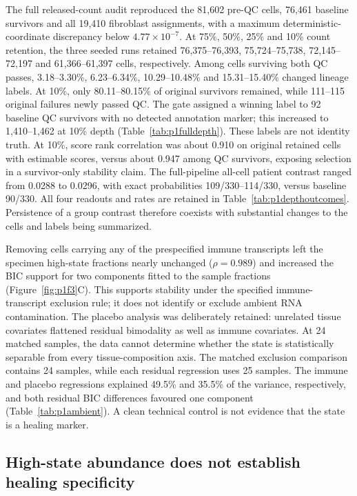 \documentclass[10pt,a4paper]{article}
\begin{document}
The full released-count audit reproduced the 81,602 pre-QC cells, 76,461 baseline survivors and all 19,410 fibroblast assignments, with a maximum deterministic-coordinate discrepancy below $4.77\times10^{-7}$. At 75\%, 50\%, 25\% and 10\% count retention, the three seeded runs retained 76,375--76,393, 75,724--75,738, 72,145--72,197 and 61,366--61,397 cells, respectively. Among cells surviving both QC passes, 3.18--3.30\%, 6.23--6.34\%, 10.29--10.48\% and 15.31--15.40\% changed lineage labels. At 10\%, only 80.11--80.15\% of original survivors remained, while 111--115 original failures newly passed QC. The gate assigned a winning label to 92 baseline QC survivors with no detected annotation marker; this increased to 1,410--1,462 at 10\% depth (Table~\ref{tab:p1fulldepth}). These labels are not identity truth. At 10\%, score rank correlation was about 0.910 on original retained cells with estimable scores, versus about 0.947 among QC survivors, exposing selection in a survivor-only stability claim. The full-pipeline all-cell patient contrast ranged from 0.0288 to 0.0296, with exact probabilities 109/330--114/330, versus baseline 90/330. All four readouts and rates are retained in Table~\ref{tab:p1depthoutcomes}. Persistence of a group contrast therefore coexists with substantial changes to the cells and labels being summarized.

Removing cells carrying any of the prespecified immune transcripts left the specimen high-state fractions nearly unchanged ($\rho=0.989$) and increased the BIC support for two components fitted to the sample fractions (Figure~\ref{fig:p1f3}C). This supports stability under the specified immune-transcript exclusion rule; it does not identify or exclude ambient RNA contamination. The placebo analysis was deliberately retained: unrelated tissue covariates flattened residual bimodality as well as immune covariates. At 24 matched samples, the data cannot determine whether the state is statistically separable from every tissue-composition axis. The matched exclusion comparison contains 24 samples, while each residual regression uses 25 samples. The immune and placebo regressions explained 49.5\% and 35.5\% of the variance, respectively, and both residual BIC differences favoured one component (Table~\ref{tab:p1ambient}). A clean technical control is not evidence that the state is a healing marker.

\subsection{High-state abundance does not establish healing specificity}
\end{document}
